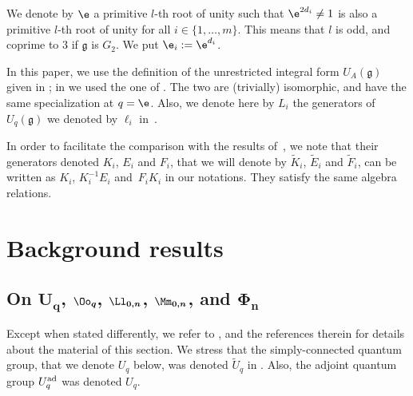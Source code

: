 We denote by $\e$ a primitive $l$-th root of unity such that $\e^{2d_i}\ne 1$ is also a primitive $l$-th root of unity for all $i\in \{1,\dots,m\}$. This means that $l$ is odd, and coprime to $3$ if $\mathfrak{g}$ is $G_2$. We put $\e_i:=\e^{d_i}$.

In this paper, we use the definition of the unrestricted integral form $U_A(\mathfrak{g})$ given in \cite{DC-L,DC-K-P2}; in \cite{BR} we used the one of \cite{DC-K,DC-K-P1}. The two are (trivially) isomorphic, and have the same specialization at $q=\e$. Also, we denote here by $L_i$ the generators of $U_q(\mathfrak{g})$ we denoted by $\ell_i$ in~\cite{BR}.

In order to facilitate the comparison with the results of~\cite{DC-L}, we note that their generators denoted $K_i$, $E_i$ and $F_i$, that we will denote by $\tilde{K}_i$, $\tilde{E}_i$ and $\tilde{F}_i$, can be written as $K_i$, $K_i^{-1}E_i$ and~$F_iK_i$ in our notations. They satisfy the same algebra relations.

\section{Background results}\label{PREL}

\subsection[On U\_q, O\_q, L\_{0,n}, M\_{0,n}, and Phi\_n]{On $\boldsymbol{U_q}$, $\boldsymbol{\Oo_q}$, $\boldsymbol{\Ll_{0,n}}$, $\boldsymbol{\Mm_{0,n}}$, and $\boldsymbol{\Phi_n}$}\label{ALGdef}
Except when stated differently, we refer to \cite[Sections 2--4 and 6]{BR}, and the references therein for details about the material of this section. We stress that the simply-connected quantum group, that we denote $U_q$ below, was denoted $\tilde U_q$ in \cite{BR}. Also, the adjoint quantum group $U_q^{\rm ad}$ was denoted $U_q$.



